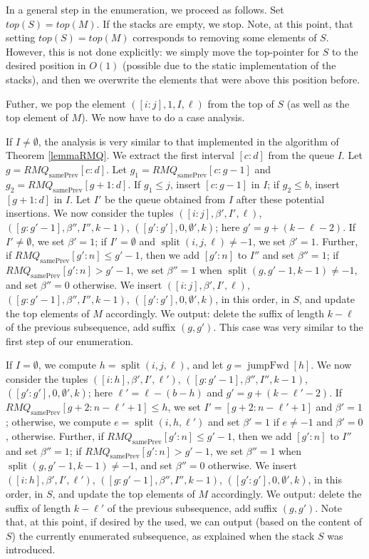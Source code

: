 \documentclass[10pt,a4paper]{amsart}
\makeatletter
\DeclareMathOperator{\splitt}{split}
\DeclareMathOperator{\prevArray}{samePrev}
\DeclareMathOperator{\jumpAhead}{{jumpFwd}}
\theoremstyle{plain}
\theoremstyle{definition}
\renewenvironment{proof}[1][\proofname]{\par
  \pushQED{}%
  \normalfont \topsep6\p@\@plus6\p@\relax
  \trivlist
  \item[\hskip\labelsep\itshape #1\@addpunct{.}]\ignorespaces
}{%
  \popQED\endtrivlist\@endpefalse
}
\makeatother
\begin{document}
\begin{proof}
In a general step in the enumeration, we proceed as follows. Set $top(S)=top(M)$. If the stacks are empty, we stop. Note, at this point, that setting $top(S)=top(M)$ corresponds to removing some elements of $S$. However, this is not done explicitly: we simply move the top-pointer for $S$ to the desired position in $O(1)$ (possible due to the static implementation of the stacks), and then we overwrite the elements that were above this position before.

Futher, we pop the element $([i:j],1,I,\ell)$ from the top of $S$ (as well as the top element of $M$). We now have to do a case analysis. 

If $I\neq \emptyset$, the analysis is very similar to that implemented in the algorithm of Theorem \ref{lemmaRMQ}. We extract the first interval $[c:d]$ from the queue $I$. Let $g=RMQ_{\prevArray}[c:d]$. Let $g_1=RMQ_{\prevArray}[c:g-1]$ and $g_2=RMQ_{\prevArray}[g+1:d]$. If $g_1\leq j$, insert $[c:g-1]$ in $I$; if $g_2\leq b$, insert $[g+1:d]$ in $I$. Let $I'$ be the queue obtained from $I$ after these potential insertions. We now consider the tuples $([i:j],\beta',I',\ell)$, $([g:g'-1],\beta'', I'', k-1)$, $([g':g'],0, \emptyset', k)$; here $g'=g+(k-\ell-2)$. If $I'\neq \emptyset$, we set $\beta'=1$; if $I'=\emptyset$ and $\splitt(i,j,\ell)\neq -1$, we set $\beta'=1$. Further, if $RMQ_{\prevArray}[g':n]\leq g'-1$, then we add $[g':n]$ to $I''$ and set $\beta''=1$; if $RMQ_{\prevArray}[g':n]> g'-1$, we set $\beta''=1$ when $\splitt(g,g'-1,k-1)\neq -1$, and set $\beta''=0$ otherwise. We insert $([i:j],\beta',I',\ell)$, $([g:g'-1],\beta'', I'', k-1)$, $([g':g'],0, \emptyset', k)$, in this order, in $S$, and update the top elements of $M$ accordingly. We output: delete the suffix of length $k-\ell$ of the previous subsequence, add suffix $(g,g')$. This case was very similar to the first step of our enumeration. 

If $I= \emptyset$, we compute $h=\splitt(i,j,\ell)$, and let $g=\jumpAhead[h]$. We now consider the tuples $([i:h],\beta',I',\ell')$, $([g:g'-1],\beta'', I'', k-1)$, $([g':g'],0, \emptyset', k)$; here $\ell'=\ell-(b-h)$ and $g'=g+(k-\ell'-2)$. 
If $RMQ_{\prevArray}[g+2:n-\ell'+1] \leq h$, we set $I'=[g+2:n-\ell'+1]$ and $\beta'=1$; otherwise, we compute $e=\splitt(i,h,\ell')$ and set $\beta'=1$ if $e\neq -1$ and $\beta'=0$, otherwise.
Further, if $RMQ_{\prevArray}[g':n]\leq g'-1$, then we add $[g':n]$ to $I''$ and set $\beta''=1$; if $RMQ_{\prevArray}[g':n]> g'-1$, we set $\beta''=1$ when $\splitt(g,g'-1,k-1)\neq -1$, and set $\beta''=0$ otherwise. 
We insert $([i:h],\beta',I',\ell')$, $([g:g'-1],\beta'', I'', k-1)$, $([g':g'],0, \emptyset', k)$, in this order, in $S$, and update the top elements of $M$ accordingly. We output: delete the suffix of length $k-\ell'$ of the previous subsequence, add suffix $(g,g')$. Note that, at this point, if desired by the used, we can output (based on the content of $S$) the currently enumerated subsequence, as explained when the stack $S$ was introduced.


\end{proof}
\end{document}
